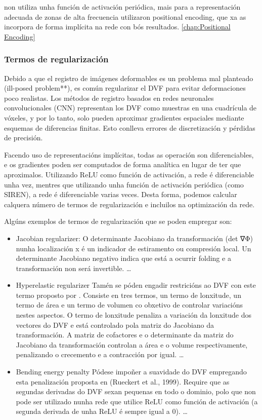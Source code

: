 \cite{mildenhall2020nerfrepresentingscenesneural} non utiliza unha función de activación periódica, mais para a representación adecuada de zonas de alta frecuencia 
utilizaron positional encoding, que xa as incorpora de forma implícita na rede con bós resultados. \ref{chap:Positional Encoding}

\subsubsection{Termos de regularización}
\label{subsubsec:Termos de regularización}

Debido a que el registro de imágenes deformables es un problema mal planteado (ill-posed problem**), 
es común regularizar el DVF para evitar deformaciones poco realistas.
 Los métodos de registro basados en redes neuronales convolucionales (CNN) representan los DVF 
 como muestras en una cuadrícula de vóxeles, y por lo tanto, solo pueden aproximar gradientes espaciales
 mediante esquemas de diferencias finitas. Esto conlleva errores de discretización y pérdidas de precisión.

Facendo uso de representacións implícitas, todas as operación son diferenciables, e os gradientes poden
 ser computados de forma analítica en lugar de ter que aproximalos.
Utilizando ReLU como función de activación, a rede é diferenciable unha vez, mentres que utilizando
 unha función de activación periódica (como SIREN), a rede é diferenciable varias veces.
Desta forma, podemos calcular calquera número de termos de regularización e incluilos na optimización da rede.

Algúns exemplos de termos de regularización que se poden empregar son:
\begin{itemize}
    \item Jacobian regularizer: 
    O determinante Jacobiano da transformación (det ∇Φ) nunha localización x é un indicador de estiramento ou compresión local.
    Un determinante Jacobiano negativo indica que está a ocurrir folding e a transformación non será invertible.
    \dots

    \item Hyperelastic regularizer
    Tamén se póden engadir restricións ao DVF con este termo proposto por \cite{HyperelasticRegularization}.
    Consiste en tres termos, un termo de lonxitude, un termo de área e un termo de volumen co obxetivo de controlar variacións nestes aspectos.
    O termo de lonxitude penaliza a variación da lonxitude dos vectores do DVF e está controlado pola matriz do Jacobiano da transformación.
    A matriz de cofactores e o determinante da matriz do Jacobiano da transformación controlan a área e o volume respectivamente, 
    penalizando o crecemento e a contracción por igual.
    \dots

    \item Bending energy penalty
    Pódese impoñer a suavidade do DVF empregando esta penalización proposta en (Rueckert et al., 1999).
    Require que as segundas derivadas do DVF sexan pequenas en todo o dominio, 
    polo que non pode ser utilizado nunha rede que utilice ReLU como función de activación (a segunda derivada de unha ReLU é sempre igual a 0).
    \dots
\end{itemize}



